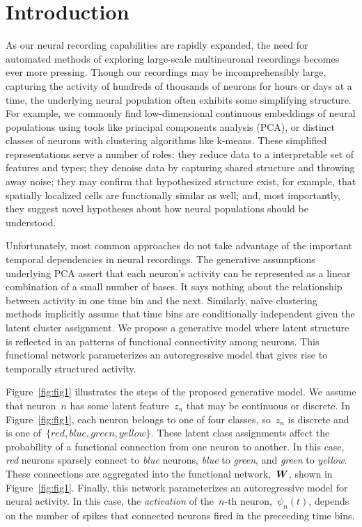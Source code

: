 \section{Introduction}
As our neural recording capabilities are rapidly expanded, the need for automated methods of exploring large-scale multineuronal recordings becomes ever more pressing. 
Though our recordings may be incomprehensibly large, capturing the activity of hundreds of thousands of neurons for hours or days at a time, the underlying neural population often exhibits some simplifying structure. 
For example, we commonly find low-dimensional continuous embeddings of neural populations using tools like principal components analysis (PCA), or distinct classes of neurons with clustering algorithms like k-means. 
These simplified representations serve a number of roles: 
they reduce data to a interpretable set of features and types; 
they denoise data by capturing shared structure and throwing away noise; 
they may confirm that hypothesized structure exist, for example, that spatially localized cells are functionally similar as well; 
and, most importantly, they suggest novel hypotheses about how neural populations should be understood.


Unfortunately, most common approaches do not take advantage of the important temporal dependencies in neural recordings. 
The generative assumptions underlying PCA assert that each neuron's activity can be represented as a linear combination of a small number of bases. 
It says nothing about the relationship between activity in one time bin and the next.
Similarly, na\"ive clustering methods implicitly assume that time bins are conditionally independent given the latent cluster assignment. 
We propose a generative model where latent structure is reflected in an patterns of functional connectivity among neurons.  This functional network parameterizes an autoregressive model that gives rise to temporally structured activity.
  
Figure~\ref{fig:fig1} illustrates the steps of the proposed generative model. 
We assume that neuron~$n$ has some latent feature~$z_n$ that may be continuous or discrete. 
In Figure~\ref{fig:fig1}, each neuron belongs to one of four classes, so~$z_n$ is discrete and is one of~$\{\textit{red}, \textit{blue}, \textit{green}, \textit{yellow}\}$. 
These latent class assignments affect the probability of a functional connection from one neuron to another. 
In this case, \textit{red} neurons sparsely connect to \textit{blue} neurons, \textit{blue} to \textit{green}, and \textit{green} to \textit{yellow}.
These connections are aggregated into the functional network,~$\boldsymbol{W}$, shown in Figure~\ref{fig:fig1}.
Finally, this network parameterizes an autoregressive model for neural activity.
In this case, the \textit{activation} of the~$n$-th neuron,~$\psi_n(t)$, depends on the number of spikes that connected neurons fired in the preceeding time bins. 

